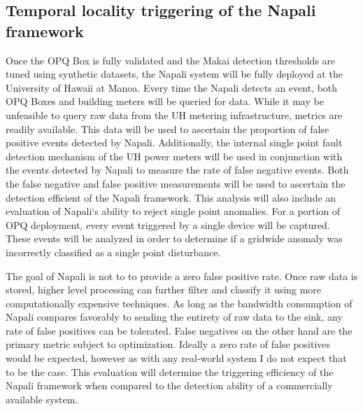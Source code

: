\subsection{Temporal locality triggering of the Napali framework} \label{iexp:sec:loc}
Once the OPQ Box is fully validated and the Makai detection thresholds are tuned using synthetic datasets, the Napali system will be fully deployed at the University of Hawaii at Manoa.  Every time the Napali detects an event, both OPQ Boxes and building meters will be queried for data. While it may be unfeasible to query raw data from the UH metering infrastructure, metrics are readily available. This data will be used to ascertain the proportion of false positive events detected by Napali. Additionally, the internal single point fault detection mechanism of the UH power meters will be used in conjunction with the events detected by Napali to measure the rate of false negative events. Both the false negative and false positive measurements will be used to ascertain the detection efficient of the Napali framework. This analysis will also include an evaluation  of Napali`s ability to reject single point anomalies. For a portion of OPQ deployment, every event triggered by a single device will be captured. These events will be analyzed in order to determine if a gridwide anomaly was incorrectly classified as a single point disturbance. 

The goal of Napali is not to to provide a zero false positive rate. Once raw data is stored, higher level processing can further filter and classify it using more computationally expensive techniques. As long as the bandwidth consumption of Napali compares favorably to sending the entirety of raw data to the sink, any rate of false positives can be tolerated. False negatives on the other hand are the primary metric subject to optimization. Ideally a zero rate of false positives would be expected, however as with any real-world system I do not expect that to be the case. This evaluation will determine the triggering efficiency of the Napali framework when compared to the detection ability of a commercially available system.

